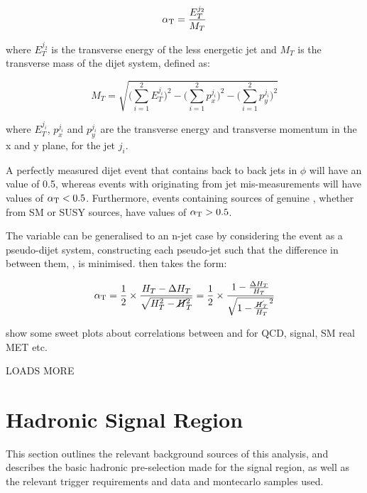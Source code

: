 \begin{equation}
\alpha_{\text{T}} = \frac{E_T^{j_2}}{M_T}
\label{eq:alphat_dijet}
\end{equation}

where $E_T^{j_2}$ is the transverse energy of the less energetic jet and $M_T$ 
is the transverse mass of the dijet system, defined as:

\begin{equation}
M_T = \sqrt{\bigg(\sum^2_{i=1}{E_T^{j_i}}\bigg)^2 - \bigg(\sum^2_{i=1}{p_x^{j_i}}\bigg)^2 - \bigg(\sum^2_{i=1}{p_y^{j_i}}\bigg)^2}
\label{eq:mt}
\end{equation}

where $E_T^{j_i}$, $p_x^{j_i}$ and $p_y^{j_i}$ are the transverse energy and 
transverse momentum in the x and y plane, for the jet $j_i$.

A perfectly measured dijet event that contains back to back jets in $\phi$ will have an
\alphat value of 0.5, whereas 
events with \mht originating from jet mis-measurements will have values of $\alpha_{\text{T}}<0.5$.
Furthermore, events
containing sources of genuine \met, whether from SM or SUSY 
sources, have values of $\alpha_{\text{T}} > 0.5$. 

The \alphat variable can be generalised to an n-jet case by considering the event as a 
pseudo-dijet system, constructing each pseudo-jet such that the difference in \HT
between them, \deltaHT, is minimised. \alphat then takes the 
form:

\begin{equation}
\alpha_{\text{T}} = \frac{1}{2} \times \frac{H_T-\Delta H_T}{\sqrt{H_T^2 - \cancel{H}_T^2}} = 
\frac{1}{2} \times \frac{1-\frac{\Delta H_T}{H_T}}{\sqrt{1 - \frac{\cancel{H}_T}{H_T}^2}}
\label{eq:alphat_njet}
\end{equation}

show some sweet plots about correlations between \mht and \deltaHT for QCD, 
signal, SM real MET etc.

LOADS MORE


\section{Hadronic Signal Region}
\label{sec:selection_hadronic}

This section outlines the relevant background sources of this analysis, and
describes the basic hadronic pre-selection made for the signal 
region, as well as the relevant trigger requirements and data and 
montecarlo samples used.

